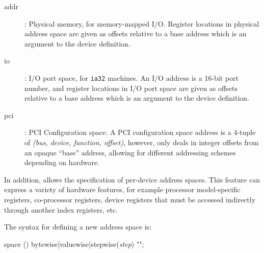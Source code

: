 \documentclass[a4paper,11pt,twoside]{report}
\begin{document}
\begin{description}

\item[addr]: Physical memory, for memory-mapped I/O.  Register
  locations in physical address space are given as offsets relative to
  a base address which is an argument to the device definition. 

\item[io]: I/O port space, for \texttt{ia32} machines.  An I/O address
  is a 16-bit port number, and register locations in I/O port space
  are given as offsets relative to a base address which is an argument
  to the device definition.   

\item[pci]: PCI Configuration space.  A PCI configuration space
  address is a 4-tuple of \textit{(bus, device, function, offset)}, however,
  \Mac only deals in integer offsets from an opaque ``base'' address,
  allowing for different addressing schemes depending on hardware.  

\end{description}

In addition, \Mac allows the specification of per-device address
spaces.  This feature can express a variety of hardware features, for
example processor model-specific registers, co-processor registers, 
device registers that must be accessed indirectly through another
index registers, etc.  

The syntax for defining a new address space is:

\begin{syntax}
space () bytewise|valuewise|stepwise(\textit{step}) 
          ""; 
\end{syntax}
\end{document}
